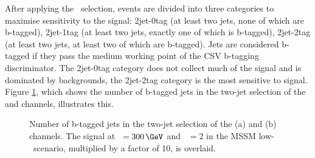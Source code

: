 After applying the \mT~selection, events are divided into three categories to maximise
sensitivity to the signal: 2jet-0tag (at least two jets, none of which are b-tagged), \mbox{2jet-1tag} 
(at least two jets, exactly one of which is b-tagged), \mbox{2jet-2tag} (at least two jets, at least two of which are b-tagged).
Jets are considered b-tagged if they pass the medium working point of the \ac{CSV} b-tagging discriminator.
The 2jet-0tag category does not collect much of the signal and is dominated by 
backgrounds, the 2jet-2tag category is the most sensitive to signal. 
Figure \ref{fig:Hhh_selection_bjets}, which shows the number of b-tagged jets in the two-jet selection of the \mutau and \etau
channels, illustrates this.

\begin{figure}[h!]
\begin{center}
\end{center}
\caption[Number of b-tagged jets in the two-jet selection of the \mutau and \etau channels.]{Number of b-tagged jets in the two-jet selection of the (a) \mutau and (b) \etau channels. The signal
at \mH~$=300\,\GeV$ and \tanb~$=2$ in the \ac{MSSM} low-\tanb~scenario, multiplied by a factor of 10, is overlaid.}
\label{fig:Hhh_selection_bjets}
\end{figure} 

